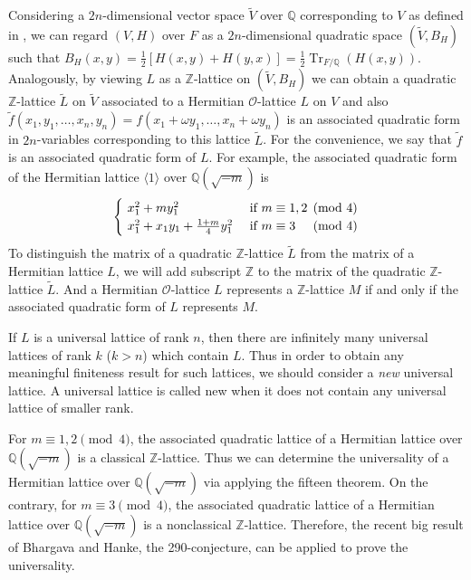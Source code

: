 \documentclass[a4paper,10pt,reqno]{amsart}
\begin{document}
Considering a $2n$-dimensional vector space $\widetilde{V}$ over $\mathbb{Q}$ corresponding to $V$
as defined in \cite{nJ_40}, we can regard $(V,H)$ over $F$ as a $2n$-dimensional quadratic space
$(\widetilde{V}, B_H)$ such that $B_H (x,y) = \frac{1}{2} [ H(x,y) + H(y,x) ] = \frac{1}{2}
{\operatorname{Tr}}_{F/\mathbb{Q}}(H(x,y))$. Analogously, by viewing $L$ as a $\mathbb{Z}$-lattice on
$(\widetilde{V}, B_H)$ we can obtain a quadratic $\mathbb{Z}$-lattice $\widetilde{L}$ on
$\widetilde{V}$ associated to a Hermitian ${\mathcal{O}}$-lattice $L$ on $V$ and also $\widetilde{f}(x_1,
y_1, \dotsc, x_n, y_n) = f(x_1 +\omega y_1, \dotsc, x_n +\omega y_n)$ is an associated quadratic
form in $2n$-variables corresponding to this lattice $\widetilde{L}$. For the convenience, we say
that $\widetilde{f}$ is an associated quadratic form of $L$. For example, the associated quadratic
form of the Hermitian lattice ${\langle {1} \rangle}$ over ${\mathbb{Q}(\sqrt{{-m}})}$ is
\[
    \begin{cases}
        ~x_1^2 + m y_1^2                       &\text{ if } m \equiv 1, 2 \pmod{4}\\
        ~x_1^2 + x_1 y_1 + \frac{1+m}{4} y_1^2 &\text{ if } m \equiv 3 \hspace{2.2ex}   \pmod{4}
    \end{cases}
\]
To distinguish the matrix of a quadratic ${\mathbb{Z}}$-lattice $\widetilde{L}$ from the matrix of a
Hermitian lattice $L$, we will add subscript ${\mathbb{Z}}$ to the matrix of the quadratic ${\mathbb{Z}}$-lattice
$\widetilde{L}$. And a Hermitian ${\mathcal{O}}$-lattice $L$ represents a ${\mathbb{Z}}$-lattice $M$ if and only if
the associated quadratic form of $L$ represents $M$.

If $L$ is a universal lattice of rank $n$, then there are infinitely many universal lattices of
rank $k$ ($k > n$) which contain $L$. Thus in order to obtain any meaningful finiteness result for
such lattices, we should consider a \emph{new} universal lattice. A universal lattice is called new
when it does not contain any universal lattice of smaller rank.

For $m \equiv 1, 2 \pmod{4}$, the associated quadratic lattice of a Hermitian lattice over ${\mathbb{Q}(\sqrt{{-m}})}$
is a classical ${\mathbb{Z}}$-lattice. Thus we can determine the universality of a Hermitian lattice over
${\mathbb{Q}(\sqrt{{-m}})}$ via applying the fifteen theorem. On the contrary, for $m \equiv 3 \pmod{4}$, the
associated quadratic lattice of a Hermitian lattice over ${\mathbb{Q}(\sqrt{{-m}})}$ is a nonclassical ${\mathbb{Z}}$-lattice.
Therefore, the recent big result of Bhargava and Hanke, the 290-conjecture, can be applied to prove
the universality.
\end{document}
